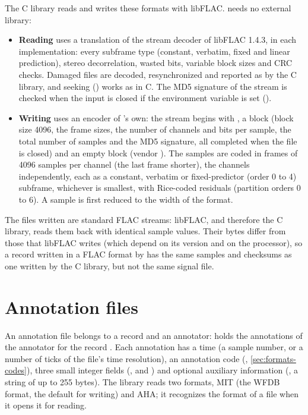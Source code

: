 The C library reads and writes these formats with libFLAC. \wfdbx{} needs no external
library:
\begin{itemize}
\item \textbf{Reading} uses a translation of the stream decoder of libFLAC 1.4.3, in each
  implementation: every subframe type (constant, verbatim, fixed and linear prediction),
  stereo decorrelation, wasted bits, variable block sizes and CRC checks. Damaged files are
  decoded, resynchronized and reported as by the C library, and seeking
  () works as in C. The MD5 signature of the stream is checked when the
  input is closed if the environment variable  is set
  ().
\item \textbf{Writing} uses an encoder of \wfdbx{}'s own: the stream begins with
  , a  block (block size 4096, the frame sizes, the number of
  channels and bits per sample, the total number of samples and the MD5 signature, all
  completed when the file is closed) and an empty  block (vendor
  ). The samples are coded in frames of 4096 samples per channel (the last
  frame shorter), the channels independently, each as a constant, verbatim or
  fixed-predictor (order 0 to 4) subframe, whichever is smallest, with Rice-coded residuals
  (partition orders 0 to 6). A sample is first reduced to the width of the format.
\end{itemize}
The files written are standard FLAC streams: libFLAC, and therefore the C library, reads
them back with identical sample values. Their bytes differ from those that libFLAC writes
(which depend on its version and on the processor), so a record written in a FLAC format
by \wfdbx{} has the same samples and checksums as one written by the C library, but not the
same signal file.

\section{Annotation files}
\label{sec:formats-annotations}

An annotation file belongs to a record and an annotator:  holds the
annotations of the annotator  for the record . Each annotation has a
time (a sample number, or a number of ticks of the file's time resolution), an annotation
code (, \cref{sec:formats-codes}), three small integer fields (,
 and ) and optional auxiliary information (, a string of up
to 255 bytes). The library reads two formats, MIT (the WFDB format, the default for
writing) and AHA; it recognizes the format of a file when it opens it for reading.

